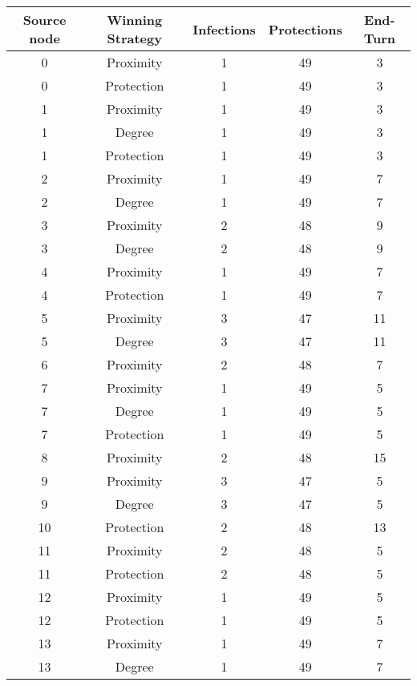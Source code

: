 \documentclass[results.tex]{subfiles}
\begin{document}
\begin{center}
  \begin{tabular}{| c || c | c | c | c |}
    \hline
    {\bfseries Source node} & {\bfseries Winning Strategy} & {\bfseries Infections} & {\bfseries Protections} & {\bfseries End-Turn} \\  %
    \hline\hline
    0 & Proximity & 1 & 49 & 3 \\ 
    \hline
    0 & Protection & 1 & 49 & 3 \\ 
    \hline
    1 & Proximity & 1 & 49 & 3 \\ 
    \hline
    1 & Degree & 1 & 49 & 3 \\ 
    \hline
    1 & Protection & 1 & 49 & 3 \\ 
    \hline
    2 & Proximity & 1 & 49 & 7 \\ 
    \hline
    2 & Degree & 1 & 49 & 7 \\ 
    \hline
    3 & Proximity & 2 & 48 & 9 \\ 
    \hline
    3 & Degree & 2 & 48 & 9 \\ 
    \hline
    4 & Proximity & 1 & 49 & 7 \\ 
    \hline
    4 & Protection & 1 & 49 & 7 \\ 
    \hline
    5 & Proximity & 3 & 47 & 11 \\ 
    \hline
    5 & Degree & 3 & 47 & 11 \\ 
    \hline
    6 & Proximity & 2 & 48 & 7 \\ 
    \hline
    7 & Proximity & 1 & 49 & 5 \\ 
    \hline
    7 & Degree & 1 & 49 & 5 \\ 
    \hline
    7 & Protection & 1 & 49 & 5 \\ 
    \hline
    8 & Proximity & 2 & 48 & 15 \\ 
    \hline
    9 & Proximity & 3 & 47 & 5 \\ 
    \hline
    9 & Degree & 3 & 47 & 5 \\ 
    \hline
    10 & Protection & 2 & 48 & 13 \\ 
    \hline
    11 & Proximity & 2 & 48 & 5 \\ 
    \hline
    11 & Protection & 2 & 48 & 5 \\ 
    \hline
    12 & Proximity & 1 & 49 & 5 \\ 
    \hline
    12 & Protection & 1 & 49 & 5 \\ 
    \hline
    13 & Proximity & 1 & 49 & 7 \\ 
    \hline
    13 & Degree & 1 & 49 & 7 \\ 

\end{tabular}
\end{center}
\end{document}
